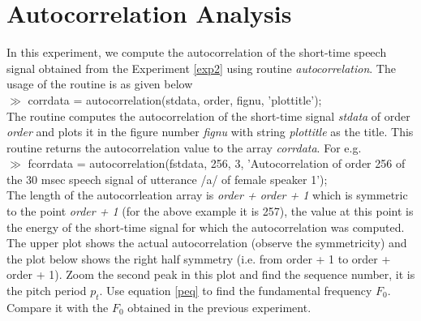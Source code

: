 \section{Autocorrelation Analysis}
\label{exp3}
In this experiment, we compute the autocorrelation of the short-time
speech signal obtained from the Experiment \ref{exp2} using routine
{\it autocorrelation}. The usage of the routine is as given
below\\[2ex]
\noindent
$\gg$ corrdata =  autocorrelation(stdata, order, fignu,
'plottitle');\\[2ex] 
\noindent
The routine computes the autocorrelation of the short-time signal {\it
stdata} of order {\it order} and plots it in the figure number {\it
fignu} with string {\it plottitle} as the title. This routine returns
the autocorrelation value to the array {\it corrdata}. For e.g.\\[2ex]
\noindent
$\gg$ fcorrdata = autocorrelation(fstdata, 256, 3, 'Autocorrelation of
order 256 of the 30 msec speech signal of utterance /a/ of female
speaker 1');\\[1ex]
\noindent
The length of the autocorrleation array is {\it order + order + 1} which is
symmetric to the point {\it order + 1} (for the above example it is 257),
the value at this point is the energy of the short-time signal for
which the autocorrelation was computed. The upper plot shows the
actual autocorrelation (observe the symmetricity) and the plot
below shows the right half symmetry (i.e. from order + 1 to order +
order + 1). Zoom the second peak in this plot and find
the sequence number, it is the pitch period
$p_{t}$. Use equation \ref{peq} to find the fundamental frequency
$F_{0}$. Compare it with the $F_{0}$ obtained in the previous
experiment.

